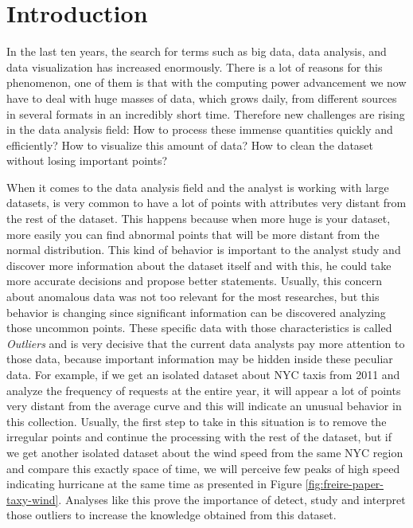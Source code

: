 \chapter{Introduction}


In the last ten years, the search for terms such as big data, data analysis, and data visualization has increased enormously. There is a lot of reasons for this phenomenon, one of them is that with the computing power advancement we now have to deal with huge masses of data, which grows daily, from different sources in several formats in an incredibly short time. Therefore new challenges are rising in the data analysis field: How to process these immense quantities quickly and efficiently? How to visualize this amount of data? How to clean the dataset without losing important points?

When it comes to the data analysis field and the analyst is working with large datasets, is very common to have a lot of points with attributes very distant from the rest of the dataset. This happens because when more huge is your dataset, more easily you can find abnormal points that will be more distant from the normal distribution. This kind of behavior is important to the analyst study and discover more information about the dataset itself and with this, he could take more accurate decisions and propose better statements. Usually, this concern about anomalous data was not too relevant for the most researches, but this behavior is changing since significant information can be discovered analyzing those uncommon points. These specific data with those characteristics is called \textit{Outliers} and is very decisive that the current data analysts pay more attention to those data, because important information may be hidden inside these peculiar data. For example, if we get an isolated dataset about NYC taxis from 2011 and analyze the frequency of requests at the entire year, it will appear a lot of points very distant from the average curve and this will indicate an unusual behavior in this collection. Usually, the first step to take in this situation is to remove the irregular points and continue the processing with the rest of the dataset, but if we get another isolated dataset about the wind speed from the same NYC region and compare this exactly space of time, we will perceive few peaks of high speed indicating hurricane at the same time \cite{DBLP:journals/debu/FreireCVZ16} as presented in Figure \ref{fig:freire-paper-taxy-wind}. Analyses like this prove the importance of detect, study and interpret those outliers to increase the knowledge obtained from this dataset.

